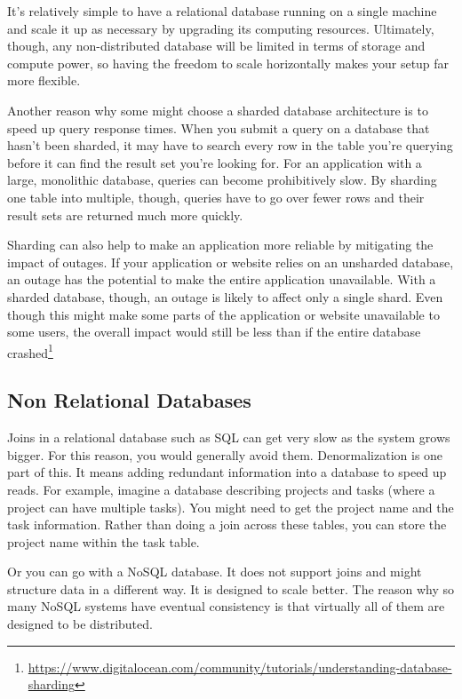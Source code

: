 \documentclass[a4paper, 11.25pt]{article}
\begin{document}
It’s relatively simple to have a relational database running on a single machine and scale it up as necessary by upgrading its computing resources. Ultimately, though, any non-distributed database will be limited in terms of storage and compute power, so having the freedom to scale horizontally makes your setup far more flexible.

Another reason why some might choose a sharded database architecture is to speed up query response times. When you submit a query on a database that hasn’t been sharded, it may have to search every row in the table you’re querying before it can find the result set you’re looking for. For an application with a large, monolithic database, queries can become prohibitively slow. By sharding one table into multiple, though, queries have to go over fewer rows and their result sets are returned much more quickly.

Sharding can also help to make an application more reliable by mitigating the impact of outages. If your application or website relies on an unsharded database, an outage has the potential to make the entire application unavailable. With a sharded database, though, an outage is likely to affect only a single shard. Even though this might make some parts of the application or website unavailable to some users, the overall impact would still be less than if the entire database crashed\footnote{\url{https://www.digitalocean.com/community/tutorials/understanding-database-sharding}}

\subsection{Non Relational Databases}
Joins in a relational database such as SQL can get very slow as the system grows bigger. For this reason, you would generally avoid them. Denormalization is one part of this. It means adding redundant information into a database to speed up reads. For example, imagine a database describing projects and tasks (where a project can have multiple tasks). You might need to get the project name and the task information. Rather than doing a join across these tables, you can store the project name within the task table. 

Or you can go with a NoSQL database. It does not support joins and might structure data in a different way. It is designed to scale better. The reason why so many NoSQL systems have eventual consistency is that virtually all of them are designed to be distributed.



\end{document}
